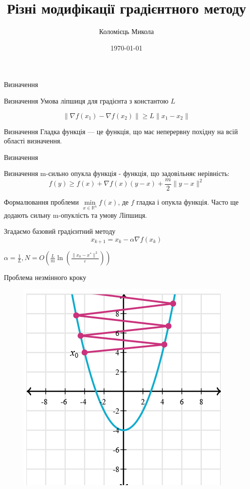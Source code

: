 \documentclass[a4paper, 14pt]{beamer}
\title{Різні модифікації градієнтного методу}
\author{Коломієць Микола}
\date{\today}
\begin{document}
\maketitle

\begin{frame}{Визначення}

    \begin{statement}{Визначення}
        Умова ліпшиця для градієнта з константою $L$

        $$\| \nabla f(x_1) - \nabla f(x_2) \| \geq L \|x_1 - x_2 \| $$
    \end{statement}
    
    \begin{statement}{Визначення}
        Гладка функція — це функція, що має неперервну похідну 
        на всій області визначення.
    \end{statement}

\end{frame}

\begin{frame}{Визначення}
    \begin{statement}{Визначення}
        m-сильно опукла функція - функція, що задовільняє нерівність:
        $$ f(y) \geq f(x) + \nabla f(x) (y - x) + \frac{m}{2}\|y - x\|^2 $$
    \end{statement}
\end{frame}

\begin{frame}{Формалювання проблеми}
    $\min\limits_{x \in \mathbb{R}^n}f(x)$, 
    де $f$ гладка і опукла функція. 
    Часто ще додають сильну m-опуклість та умову Ліпшиця. 


    Згадаємо базовий градієнтний методу
    $$x_{k+1} = x_k -\alpha \nabla f(x_k)$$

    $\alpha = \frac{1}{L}, N = O(\frac{L}{m}
    \ln(\frac{\|x_0 - x^*\|^2}{\varepsilon}))$
\end{frame}

\begin{frame}{Проблема незмінного кроку}
    \begin{figure}
        \includegraphics[width = 0.5 \textwidth]{imgs/problem_step_size.png}
    \end{figure}
    
\end{frame}
\end{document}
